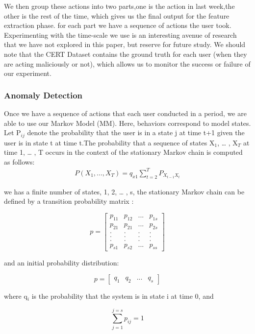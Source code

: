 \documentclass[conference]{IEEEtran}
\begin{document}
We then group these actions into two parts,one is the action in last week,the other is the rest of the time, which gives us the final output for the feature extraction phase. for each part we have a sequence of actions the user took. Experimenting with the time-scale we use is an interesting avenue of research that we have not explored in this paper, but reserve for future study. We should note that the CERT Dataset contains the ground truth for each user (when they are acting maliciously or not), which allows us to monitor the success or failure of our experiment.

\subsubsection{Anomaly Detection}

Once we have a sequence of actions that each user conducted in a period, we are able to use our Markov Model (MM)\cite{b46}. Here, behaviors correspond to model states. Let P$_{ij}$ denote the probability that the user is in a state j at time t+1 given the user is in state t at time t.The probability that a sequence of states X$_1$, … , X$_T$ at time 1, … , T occurs in the context of the stationary Markov chain is computed as follows:
\begin{align}
P(X_1,...,X_T)=q_{x1}\sum_{t=2}^T P_{X_{t-1}X_t}
\end{align}



\iffalse
 we has a finite number of states, 1, 2, … , s, the stationary Markov chain can be defined by a transition probability matrix \cite{b46}:


$$p=\begin{bmatrix}
p_{11}&p_{12}&...&p_{1s}\\
p_{21}&p_{21}&...&p_{2s}\\
.&.&.&.\\
.&.&.&.\\
.&.&.&.\\
p_{s1}&p_{s2}&...&p_{ss}
\end{bmatrix}$$

and an initial probability distribution\cite{b46}:


$$p=\begin{bmatrix}
q_{1}&q_{2}&...&q_{s}
\end{bmatrix}$$


where q$_{i}$ is the probability that the system is in state i at time 0, and

$$\sum_{j=1}^{j=s} p_{ij}=1$$
\end{document}

